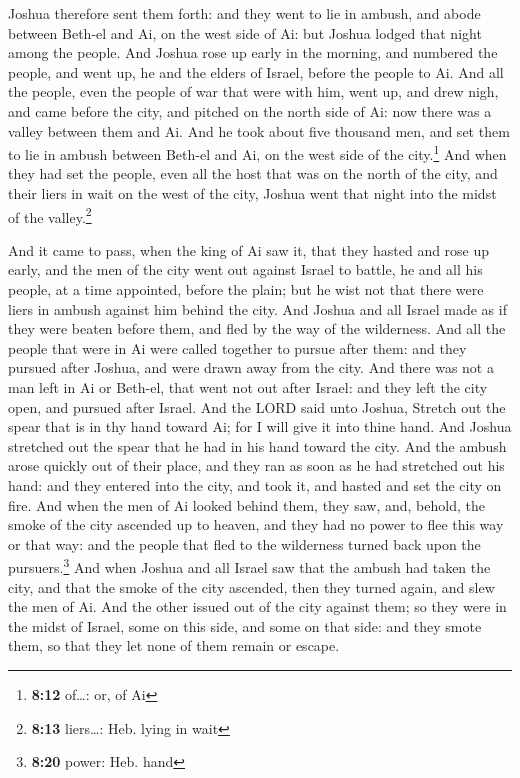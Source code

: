  Joshua therefore sent them forth: and they went to lie in
ambush, and abode between Beth-el and Ai, on the west side of Ai: but
Joshua lodged that night among the people.  And Joshua
rose up early in the morning, and numbered the people, and went up, he
and the elders of Israel, before the people to Ai.  And
all the people, even the people of war that were with him, went up, and
drew nigh, and came before the city, and pitched on the north side of
Ai: now there was a valley between them and Ai.  And he
took about five thousand men, and set them to lie in ambush between
Beth-el and Ai, on the west side of the city.\footnote{\textbf{8:12}
  of\ldots: or, of Ai}  And when they had set the people,
even all the host that was on the north of the city, and their liers in
wait on the west of the city, Joshua went that night into the midst of
the valley.\footnote{\textbf{8:13} liers\ldots: Heb. lying in wait}

 And it came to pass, when the king of Ai saw it, that
they hasted and rose up early, and the men of the city went out against
Israel to battle, he and all his people, at a time appointed, before the
plain; but he wist not that there were liers in ambush against him
behind the city.  And Joshua and all Israel made as if
they were beaten before them, and fled by the way of the wilderness.
 And all the people that were in Ai were called together
to pursue after them: and they pursued after Joshua, and were drawn away
from the city.  And there was not a man left in Ai or
Beth-el, that went not out after Israel: and they left the city open,
and pursued after Israel.  And the LORD said unto Joshua,
Stretch out the spear that is in thy hand toward Ai; for I will give it
into thine hand. And Joshua stretched out the spear that he had in his
hand toward the city.  And the ambush arose quickly out
of their place, and they ran as soon as he had stretched out his hand:
and they entered into the city, and took it, and hasted and set the city
on fire.  And when the men of Ai looked behind them, they
saw, and, behold, the smoke of the city ascended up to heaven, and they
had no power to flee this way or that way: and the people that fled to
the wilderness turned back upon the pursuers.\footnote{\textbf{8:20}
  power: Heb. hand}  And when Joshua and all Israel saw
that the ambush had taken the city, and that the smoke of the city
ascended, then they turned again, and slew the men of Ai.
 And the other issued out of the city against them; so
they were in the midst of Israel, some on this side, and some on that
side: and they smote them, so that they let none of them remain or
escape.

